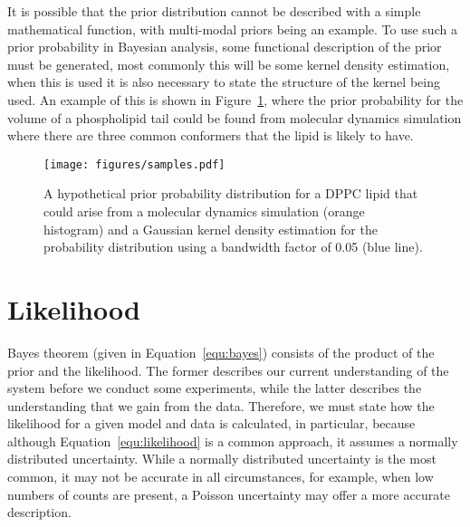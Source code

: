 \documentclass[reprint,superscriptaddress,aps,amsmath,linenumbers]{revtex4-2}
\begin{document}
It is possible that the prior distribution cannot be described with a simple mathematical function, with multi-modal priors being an example.
To use such a prior probability in Bayesian analysis, some functional description of the prior must be generated, most commonly this will be some kernel density estimation, when this is used it is also necessary to state the structure of the kernel being used. 
An example of this is shown in Figure~\ref{fig:samples}, where the prior probability for the volume of a phospholipid tail could be found from molecular dynamics simulation where there are three common conformers that the lipid is likely to have.
%
\begin{figure}
  \texttt{[image: figures/samples.pdf]}
  \caption{
    A hypothetical prior probability distribution for a DPPC lipid that could arise from a molecular dynamics simulation (orange histogram) and a Gaussian kernel density estimation for the probability distribution using a bandwidth factor of \num{0.05} (blue line). 
  }
  \label{fig:samples}
\end{figure}
%

\section{Likelihood}
\label{sec:likelihood}

Bayes theorem (given in Equation~\ref{equ:bayes}) consists of the product of the prior and the likelihood. 
The former describes our current understanding of the system before we conduct some experiments, while the latter describes the understanding that we gain from the data. 
Therefore, we must state how the likelihood for a given model and data is calculated, in particular, because although Equation~\ref{equ:likelihood} is a common approach, it assumes a normally distributed uncertainty. 
While a normally distributed uncertainty is the most common, it may not be accurate in all circumstances, for example, when low numbers of counts are present, a Poisson uncertainty may offer a more accurate description. 
\end{document}

